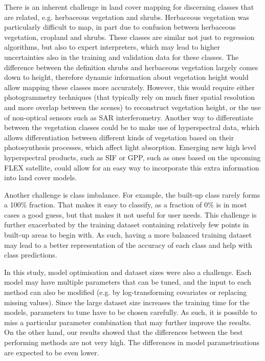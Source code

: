\documentclass[review,authoryear,3p]{elsarticle}
\begin{document}
There is an inherent challenge in land cover mapping for discerning classes that are related, e.g. herbaceous vegetation and shrubs.
Herbaceous vegetation was particularly difficult to map, in part due to confusion between herbaceous vegetation, cropland and shrubs.
These classes are similar not just to regression algorithms, but also to expert interpreters, which may lead to higher uncertainties also in the training and validation data for these classes.
The difference between the definition shrubs and herbaceous vegetation largely comes down to height, therefore dynamic information about vegetation height would allow mapping these classes more accurately.
However, this would require either photogrammetry techniques (that typically rely on much finer spatial resolution and more overlap between the scenes) to reconstruct vegetation height, or the use of non-optical sensors such as \gls{SAR} interferometry.
Another way to differentiate between the vegetation classes could be to make use of hyperspectral data, which allows differentiation between different kinds of vegetation based on their photosynthesis processes, which affect light absorption.
Emerging new high level hyperspectral products, such as \gls{SIF} or \gls{GPP}, such as ones based on the upcoming FLEX satellite, could allow for an easy way to incorporate this extra information into land cover models.

Another challenge is class imbalance.
For example, the built-up class rarely forms a 100\% fraction.
That makes it easy to classify, as a fraction of 0\% is in most cases a good guess, but that makes it not useful for user needs.
This challenge is further exacerbated by the training dataset containing relatively few points in built-up areas to begin with.
As such, having a more balanced training dataset may lead to a better representation of the accuracy of each class and help with class predictions.

In this study, model optimisation and dataset sizes were also a challenge.
Each model may have multiple parameters that can be tuned, and the input to each method can also be modified (e.g. by log-transforming covariates or replacing missing values).
Since the large dataset size increases the training time for the models, parameters to tune have to be chosen carefully.
As such, it is possible to miss a particular parameter combination that may further improve the results.
On the other hand, our results showed that the differences between the best performing methods are not very high.
The differences in model parametrisations are expected to be even lower.
\end{document}
